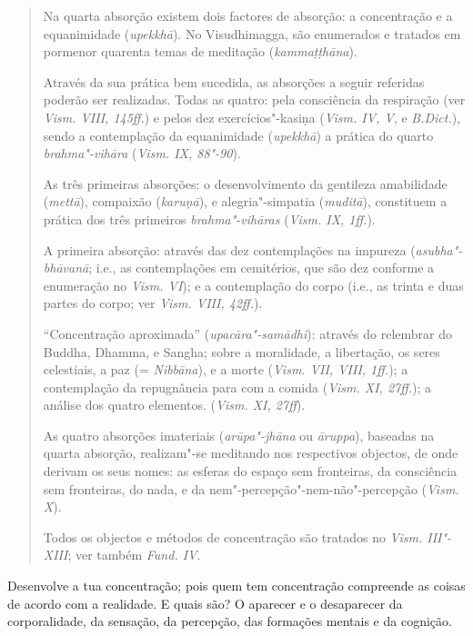 \begin{quote}
  Na quarta absorção existem dois factores de absorção: a concentração e a
  equanimidade (\emph{upekkhā}). No Visudhimagga, são enumerados e tratados em
  pormenor quarenta temas de meditação (\emph{kamma\d{t}\d{t}hāna}).

  Através da sua prática bem sucedida, as absorções a seguir referidas poderão
  ser realizadas. Todas as quatro: pela consciência da respiração (ver
  \emph{Vism. VIII, 145ff.}) e pelos dez exercícios"-kasiṇa (\emph{Vism. IV, V},
  e \emph{B.Dict.}), sendo a contemplação da equanimidade (\emph{upekkhā}) a
  prática do quarto \emph{brahma"-vihāra} (\emph{Vism. IX, 88"-90}).

  \clearpage

  As três primeiras absorções: o desenvolvimento da gentileza amabilidade
  (\emph{mettā}), compaixão (\emph{karu\d{n}ā}), e alegria"-simpatia
  (\emph{muditā}), constituem a prática dos três primeiros \emph{brahma"-vihāras}
  (\emph{Vism. IX, 1ff.}).

  A primeira absorção: através das dez contemplações na impureza
  (\emph{asubha"-bhāvanā}; i.e., as contemplações em cemitérios, que são dez
  conforme a enumeração no \emph{Vism. VI}); e a contemplação do corpo (i.e., as
  trinta e duas partes do corpo; ver \emph{Vism. VIII, 42ff.}).

  “Concentração aproximada” (\emph{upacāra"-samādhi}): através do relembrar do
  Buddha, Dhamma, e Sangha; sobre a moralidade, a libertação, os seres
  celestiais, a paz (= \emph{Nibbāna}), e a morte (\emph{Vism. VII, VIII,
    1ff.}); a contemplação da repugnância para com a comida (\emph{Vism. XI,
    27ff.}); a análise dos quatro elementos. (\emph{Vism. XI, 27ff}).

  As quatro absorções imateriais (\emph{arūpa"-jhāna} ou \emph{āruppa}), baseadas
  na quarta absorção, realizam"-se meditando nos respectivos objectos, de onde
  derivam os seus nomes: as esferas do espaço sem fronteiras, da consciência sem
  fronteiras, do nada, e da nem"-percepção"-nem-não"-percepção (\emph{Vism. X}).

  Todos os objectos e métodos de concentração são tratados no
  \emph{Vism. III"-XIII}; ver também \emph{Fund. IV}.
\end{quote}

Desenvolve a tua concentração; pois quem tem concentração compreende as coisas
de acordo com a realidade. E quais são? O aparecer e o desaparecer da
corporalidade, da sensação, da percepção, das formações mentais e da cognição.

